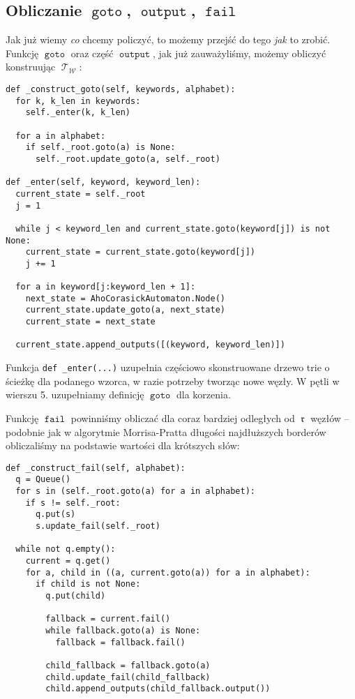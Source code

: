 \documentclass{article}
\DeclareMathOperator{\rot}{\mathfrak{r}}
\DeclareMathOperator{\W}{\mathcal{W}}
\DeclareMathOperator{\trie}{\mathcal{T}}
\DeclareMathOperator{\goto}{\texttt{goto}}
\DeclareMathOperator{\fail}{\texttt{fail}}
\DeclareMathOperator{\out}{\texttt{output}}
\begin{document}
\subsection{Obliczanie $\goto$, $\out$, $\fail$}
Jak już wiemy \textit{co} chcemy policzyć, to możemy przejść do tego \textit{jak} to zrobić. Funkcję $\goto$ oraz część $\out$, jak już zauważyliśmy, możemy obliczyć konstruując $\trie_{\W}$:
\begin{verbatim}
def _construct_goto(self, keywords, alphabet):
  for k, k_len in keywords:
    self._enter(k, k_len)

  for a in alphabet:
    if self._root.goto(a) is None:
      self._root.update_goto(a, self._root)

def _enter(self, keyword, keyword_len):
  current_state = self._root
  j = 1

  while j < keyword_len and current_state.goto(keyword[j]) is not None:
    current_state = current_state.goto(keyword[j])
    j += 1

  for a in keyword[j:keyword_len + 1]:
    next_state = AhoCorasickAutomaton.Node()
    current_state.update_goto(a, next_state)
    current_state = next_state

  current_state.append_outputs([(keyword, keyword_len)])
\end{verbatim}

Funkcja \texttt{def _enter(...)} uzupełnia częściowo skonstruowane drzewo trie o ścieżkę dla podanego wzorca, w razie potrzeby tworząc nowe węzły. W pętli w wierszu 5. uzupełniamy definicję $\goto$ dla korzenia.

\vspace{10pt}

Funkcję $\fail$ powinniśmy obliczać dla coraz bardziej odległych od $\rot$ węzłów -- podobnie jak w algorytmie Morrisa-Pratta długości najdłuższych borderów obliczaliśmy na podstawie wartości dla krótszych słów:

\begin{verbatim}
def _construct_fail(self, alphabet):
  q = Queue()
  for s in (self._root.goto(a) for a in alphabet):
    if s != self._root:
      q.put(s)
      s.update_fail(self._root)

  while not q.empty():
    current = q.get()
    for a, child in ((a, current.goto(a)) for a in alphabet):
      if child is not None:
        q.put(child)

        fallback = current.fail()
        while fallback.goto(a) is None:
          fallback = fallback.fail()

        child_fallback = fallback.goto(a)
        child.update_fail(child_fallback)
        child.append_outputs(child_fallback.output())
\end{verbatim}
\end{document}
